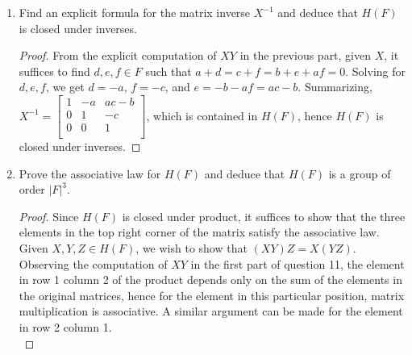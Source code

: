 \documentclass{article}
\begin{document}
\begin{enumerate}
\begin{enumerate}
\begin{enumerate}
\begin{proof}
              Then $XY =
                \begin{bmatrix}
                  1 & 1 & 1 \\
                  0 & 1 & 1 \\
                  0 & 0 & 1 \\
                \end{bmatrix} \neq
                \begin{bmatrix}
                  1 & 1 & 0 \\
                  0 & 1 & 1 \\
                  0 & 0 & 1 \\
                \end{bmatrix} = YX$.
            \end{proof}
          \item Find an explicit formula for the matrix inverse $X^{-1}$
            and deduce that $H(F)$ is closed under inverses.
            \begin{proof}
              From the explicit computation of $XY$ in the previous part,
              given $X$, it suffices to find $d,e,f\in F$ such that
              $a+d=c+f=b+e+af=0$. Solving for $d,e,f$, we get $d=-a$,
              $f=-c$, and $e=-b-af=ac-b$. Summarizing, $X^{-1} =
                \begin{bmatrix}
                  1 & -a  & ac-b \\
                  0 & 1   & -c \\
                  0 & 0   & 1 \\
                \end{bmatrix}$, which is contained in $H(F)$, hence $H(F)$
              is closed under inverses.
            \end{proof}
          \item Prove the associative law for $H(F)$ and deduce that $H(F)$
            is a group of order $|F|^3$.
            \begin{proof}
              Since $H(F)$ is closed under product, it suffices to show
              that the three elements in the top right corner of the matrix
              satisfy the associative law. \\

              Given $X,Y,Z\in H(F)$, we wish to show that $(XY)Z = X(YZ)$.
              Observing the computation of $XY$ in the first part of
              question 11, the element in row 1 column 2 of the product
              depends only on the sum of the elements in the original
              matrices, hence for the element in this particular position,
              matrix multiplication is associative. A similar argument can
              be made for the element in row 2 column 1. \\


\end{proof}
\end{enumerate}
\end{enumerate}
\end{enumerate}
\end{document}
